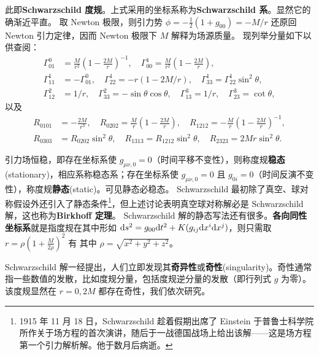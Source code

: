 此即\textbf{Schwarzschild 度规}。上式采用的坐标系称为\textbf{Schwarzschild 系}。显然它的确渐近平直。
取 Newton 极限，则引力势 $\phi=-\frac 12(1+g_{00})=-M/r$ 还原回 Newton 引力定律，因而 Newton 极限下 $M$ 解释为场源质量。
现列举分量如下以供查阅：
\begin{align*}
    \Gamma_{01}^0&=\frac{M}{r^2}\left(1-\frac{2M}{r}\right)^{-1}, \quad \Gamma_{00}^1=\frac{M}{r^2}\left(1-\frac{2M}{r}\right), \\
    \Gamma_{11}^1&=-\Gamma_{01}^0,\quad\Gamma_{22}^1=-r(1-{2M}/{r}),\quad\Gamma_{33}^1=\Gamma_{22}^1\sin ^2 \theta, \\
    \Gamma_{12}^2&=1 / r,\quad\Gamma_{33}^2=-\sin \theta \cos \theta,\quad\Gamma_{13}^3=1 / r,\quad\Gamma_{23}^3=\cot \theta,
\end{align*}
以及
\begin{align*}
    R_{0101}&=-\frac{2 M}{r^3}, \quad R_{0202}=\frac{M}{r}\left(1-\frac{2M}{r}\right), \quad R_{1212}=-\frac{M}{r}\left(1-\frac{2M}{r}\right)^{-1}, \\
    R_{0303}&=R_{0202} \sin ^2 \theta, \quad R_{1313}=R_{1212} \sin ^2 \theta, \quad R_{2323}=2 M r \sin ^2 \theta.
\end{align*}

引力场恒稳，即存在坐标系使 $g_{\mu\nu,0}=0$（时间平移不变性），则称度规\textbf{稳态}(stationary)，相应系称稳态系；存在坐标系使 $g_{\mu\nu,0}=0$ 且 $g_{0i}=0$（时间反演不变性），称度规\textbf{静态}(static)。可见静态必稳态。
Schwarzschild 最初除了真空、球对称假设外还引入了静态条件\footnote{1915 年 11 月 18 日，Schwarzschild 趁着假期出席了 Einstein 于普鲁士科学院所作关于场方程的首次演讲，随后于一战德国战场上给出该解——这是场方程第一个引力解析解。他于数月后病逝。}，但上述讨论表明真空球对称解必是 Schwarzschild 解，这也称为\textbf{Birkhoff 定理}。
Schwarzschild 解的静态写法还有很多。\textbf{各向同性坐标系}就是指度规在其中形如 $\dd s^2=g_{00}\dd t^2+K(g_{ij}\dd x^i\dd x^j)$，则只需取 $r=\rho(1+\frac{M}{2\rho})^2$ 有
其中 $\rho=\sqrt{x^2+y^2+z^2}$。

Schwarzschild 解一经提出，人们立即发现其\textbf{奇异性}或\textbf{奇性}(singularity)。奇性通常指一些数值的发散，比如度规分量，包括度规逆分量的发散（即行列式 $g$ 为零）。该度规显然在 $r=0,2M$ 都存在奇性，我们依次研究。

